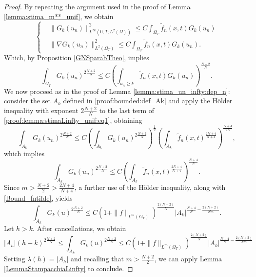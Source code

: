 \documentclass{amsart}
\numberwithin{equation}{section}
\def\elle#1{L^{#1}}
\def\elleom#1{L^{#1}(\Omega)}
\def\elleomT#1{L^{#1}(\Omega_T)}
\def\norma#1#2{ \|#1 \|_{#2}}
\newcommand{\abs}[1]{\left|#1\right|}
\begin{document}
\begin{proof}
    By repeating the argument used in the proof of Lemma \ref{lemma:stima_m**_unif}, we obtain
    \begin{equation}
        \left\{\begin{aligned}
        & \norma{G_k(u_n)}{\elle\infty(0,T;\elleom2)}^2\leq C \int_{\Omega_T}\tilde f_n(x,t)G_k(u_n)\\
        & \norma{\nabla G_k(u_n)}{\elleomT2}^2\leq C \int_{\Omega_T}\tilde f_n(x,t)G_k(u_n).
        \end{aligned}\right.
    \end{equation}
    Which, by Proposition \ref{GNSparabTheo}, implies 
    \begin{equation}\label{proof:lemma:stimaLinfty_unif:eq1}
    \int_{\Omega_T}G_k(u_n)^{2\frac{N+2}{N}}
    \leq 
    C \left(\int_{u_n\geq k}\tilde f_n(x,t)G_k(u_n)\right)^{\frac{N+2}{N}}.
    \end{equation}
    We now proceed as in the proof of Lemma \ref{lemma:stima_un_infty:dep_n}: consider the set $A_k$ defined in \eqref{proof:bounded:def_Ak} and apply the H\"older inequality with exponent $2\frac{N+2}{N}$ to the last term of \eqref{proof:lemma:stimaLinfty_unif:eq1}, obtaining
    $$
    \int_{A_k}G_k(u_n)^{2\frac{N+2}{N}}\leq C\left(\int_{A_k}G_k(u_n)^{2\frac{N+2}{N}}\right)^{\frac12}\left(\int_{A_k}\tilde f_n(x,t)^{\frac{2N+4}{N+4}}\right)^{\frac{N+4}{2N}},
    $$
    which implies
    $$
    \int_{A_k}G_k(u_n)^{2\frac{N+2}{N}}\leq C\left(\int_{A_k}\tilde f_n(x,t)^{\frac{2N+4}{N+4}}\right)^{\frac{N+4}{N}}.
    $$
    Since $m>\frac{N+2}{2}>\frac{2 N+4}{N+4}$, a further use of the H\"older inequality, along with \eqref{Bound_fntilde}, yields
    $$
    \int_{A_k} G_k(u)^{2 \frac{N+2}{N}} \leq C(1+\norma{f}{\elle m(\Omega_T)})^{\frac{2(N+2)}{N}} \abs{A_k}^{\frac{N+4}{N}-\frac{2(N+2)}{N m}} .
    $$
    Let $h>k$. After cancellations, we obtain
    $$
    \abs{A_h}(h-k)^{2 \frac{N+2}{N}} \leq \int_{A_k} G_k(u)^{2 \frac{N+2}{N}}
    \leq C  (1+\norma{f}{\elle m(\Omega_T)})^{\frac{2(N+2)}{N}}
    \abs{A_k}^{\frac{N+4}{N}-\frac{2(N+2)}{Nm}}
    $$
    Setting $\lambda(h)=\abs{A_h}$ and recalling that $m>\frac{N+2}{2}$, we can apply Lemma \ref{LemmaStampacchiaLinfty} to conclude.
\end{proof}
\end{document}
